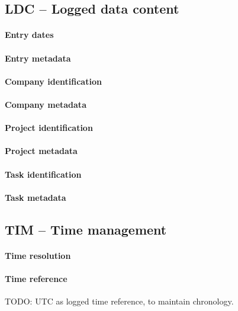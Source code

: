 \subsection{LDC -- Logged data content}
\paragraph{Entry dates}

\paragraph{Entry metadata}

\paragraph{Company identification}

\paragraph{Company metadata}

\paragraph{Project identification}

\paragraph{Project metadata}

\paragraph{Task identification}

\paragraph{Task metadata}

\subsection{TIM -- Time management}

\paragraph{Time resolution}

\paragraph{Time reference}
TODO: UTC as logged time reference, to maintain chronology.

